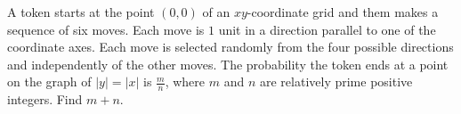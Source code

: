 A token starts at the point $(0,0)$ of an $xy$-coordinate grid and them makes a sequence of six moves. Each move is $1$ unit in a direction parallel to one of the coordinate axes. Each move is selected randomly from the four possible directions and independently of the other moves. The probability the token ends at a point on the graph of $|y|=|x|$ is $\tfrac{m}{n}$, where $m$ and $n$ are relatively prime positive integers. Find $m+n$.